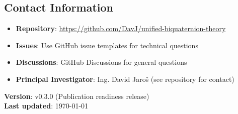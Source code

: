 \subsection*{Contact Information}

\begin{itemize}
\item \textbf{Repository}: \url{https://github.com/DavJ/unified-biquaternion-theory}
\item \textbf{Issues}: Use GitHub issue templates for technical questions
\item \textbf{Discussions}: GitHub Discussions for general questions
\item \textbf{Principal Investigator}: Ing. David Jaroš (see repository for contact)
\end{itemize}

\vspace{1em}
\noindent\textbf{Version}: v0.3.0 (Publication readiness release)\\
\textbf{Last updated}: \today
